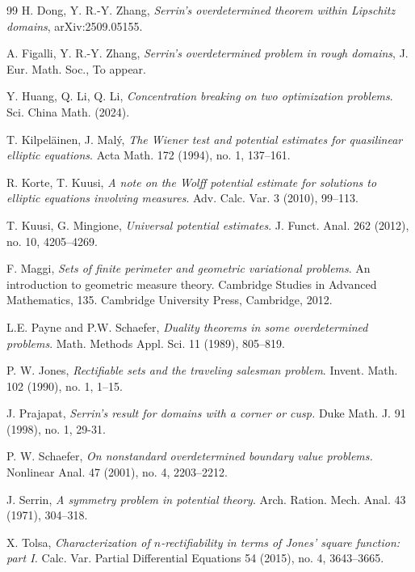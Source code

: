 \documentclass[reqno,11pt]{amsart}
\numberwithin{equation}{section}
\theoremstyle{remark}
\begin{document}
\begin{thebibliography}{99}
 H. Dong, Y. R.-Y. Zhang, \emph{Serrin's overdetermined theorem within Lipschitz domains},	arXiv:2509.05155.
 

A. Figalli, Y. R.-Y. Zhang, \emph{Serrin's overdetermined problem in rough domains}, J. Eur. Math. Soc., To appear.


 Y. Huang, Q. Li, Q. Li, \emph{Concentration breaking on two optimization problems}. Sci. China Math. (2024).

T. Kilpel\"ainen,  J. Mal\'y,
\emph{The Wiener test and potential estimates for quasilinear elliptic equations}.
Acta Math. 172 (1994), no. 1, 137--161.

R. Korte, T. Kuusi, \emph{A note on the Wolff potential estimate for solutions to elliptic equations involving measures}. Adv. Calc. Var. 3 (2010), 99--113.



T. Kuusi, G. Mingione,
\emph{Universal potential estimates}.
J. Funct. Anal. 262 (2012), no. 10, 4205--4269.

F. Maggi, 
\emph{Sets of finite perimeter and geometric variational problems}. 
An introduction to geometric measure theory. Cambridge Studies in Advanced Mathematics, 135. Cambridge University Press, Cambridge, 2012. 



L.E. Payne and P.W. Schaefer, \emph{Duality theorems in some overdetermined problems}. Math. Methods Appl. Sci. 11 (1989), 805--819.

P. W. Jones, 
\emph{Rectifiable sets and the traveling salesman problem}.
Invent. Math. 102 (1990), no. 1, 1--15.

J. Prajapat, 
\emph{Serrin's result for domains with a corner or cusp.}
Duke Math. J. 91 (1998), no. 1, 29-31.

 

P. W. Schaefer,   
\emph{On nonstandard overdetermined boundary value problems.}
Nonlinear Anal. 47 (2001), no. 4, 2203--2212.


J. Serrin, \emph{A symmetry problem in potential theory}. Arch. Ration. Mech. Anal. 43 (1971), 304--318.

X. Tolsa, 
\emph{Characterization of $n$-rectifiability in terms of Jones' square function: part I.} Calc. Var. Partial Differential Equations 54 (2015), no. 4, 3643--3665.


\end{thebibliography}
\end{document}
